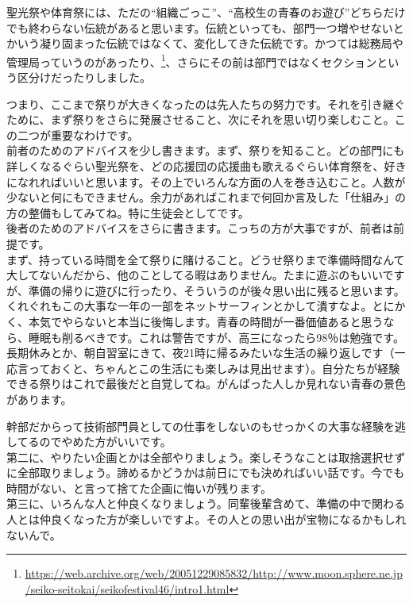\documentclass[a4paper]{ltjsreport}
\begin{document}
聖光祭や体育祭には、ただの``組織ごっこ''、``高校生の青春のお遊び''どちらだけでも終わらない伝統があると思います。伝統といっても、部門一つ増やせないとかいう凝り固まった伝統ではなくて、変化してきた伝統です。かつては総務局や管理局っていうのがあったり、\footnote{\url{https://web.archive.org/web/20051229085832/http://www.moon.sphere.ne.jp/seiko-seitokai/seikofestival46/intro1.html}}、さらにその前は部門ではなくセクションという区分けだったりしました。

つまり、ここまで祭りが大きくなったのは先人たちの努力です。それを引き継ぐために、まず祭りをさらに発展させること、次にそれを思い切り楽しむこと。この二つが重要なわけです。
\\

前者のためのアドバイスを少し書きます。まず、祭りを知ること。どの部門にも詳しくなるぐらい聖光祭を、どの応援団の応援曲も歌えるぐらい体育祭を、好きになれればいいと思います。その上でいろんな方面の人を巻き込むこと。人数が少ないと何にもできません。余力があればこれまで何回か言及した「仕組み」の方の整備もしてみてね。特に生徒会としてです。
\\

後者のためのアドバイスをさらに書きます。こっちの方が大事ですが、前者は前提です。
\\

まず、持っている時間を全て祭りに賭けること。どうせ祭りまで準備時間なんて大してないんだから、他のことしてる暇はありません。たまに遊ぶのもいいですが、準備の帰りに遊びに行ったり、そういうのが後々思い出に残ると思います。くれぐれもこの大事な一年の一部をネットサーフィンとかして潰すなよ。とにかく、本気でやらないと本当に後悔します。青春の時間が一番価値あると思うなら、睡眠も削るべきです。これは警告ですが、高三になったら98％は勉強です。長期休みとか、朝自習室にきて、夜21時に帰るみたいな生活の繰り返しです（一応言っておくと、ちゃんとこの生活にも楽しみは見出せます）。自分たちが経験できる祭りはこれで最後だと自覚してね。がんばった人しか見れない青春の景色があります。

幹部だからって技術部門員としての仕事をしないのもせっかくの大事な経験を逃してるのでやめた方がいいです。
\\

第二に、やりたい企画とかは全部やりましょう。楽しそうなことは取捨選択せずに全部取りましょう。諦めるかどうかは前日にでも決めればいい話です。今でも時間がない、と言って捨てた企画に悔いが残ります。
\\

第三に、いろんな人と仲良くなりましょう。同輩後輩含めて、準備の中で関わる人とは仲良くなった方が楽しいですよ。その人との思い出が宝物になるかもしれないんで。
\\
\end{document}
